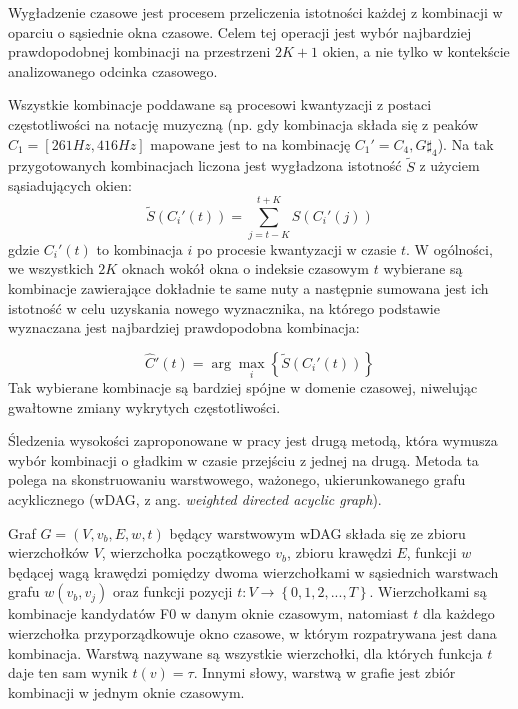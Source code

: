 \documentclass[12pt,a4paper,twoside]{mwart}
\begin{document}
Wygładzenie czasowe jest procesem przeliczenia istotności każdej z kombinacji w oparciu o sąsiednie okna czasowe. Celem tej operacji jest wybór najbardziej prawdopodobnej kombinacji na przestrzeni $2K + 1$ okien, a nie tylko w kontekście analizowanego odcinka czasowego.

Wszystkie kombinacje poddawane są procesowi kwantyzacji z postaci częstotliwości na notację muzyczną (np. gdy kombinacja składa się z peaków $C_1 = [261 Hz, 416 Hz]$ mapowane jest to na kombinację $C_1' = {C_4, G\sharp_4}$). Na tak przygotowanych kombinacjach liczona jest wygładzona istotność $\widetilde{S}$ z użyciem sąsiadujących okien:
\begin{equation} \label{eq:inharmonicity2:smoothedSalience}
  \widetilde{S}(C_i'(t)) = \sum_{j = t - K}^{t+K}S(C_i'(j))
\end{equation}
gdzie $C_i'(t)$ to kombinacja $i$ po procesie kwantyzacji w czasie $t$. W ogólności, we wszystkich $2K$ oknach wokół okna o indeksie czasowym $t$ wybierane są kombinacje zawierające dokładnie te same nuty a następnie sumowana jest ich istotność w celu uzyskania nowego wyznacznika, na którego podstawie wyznaczana jest najbardziej prawdopodobna kombinacja:

\begin{equation} \label{eq:inharmonicity2:smoothedSalience:winner}
\widehat{C}'(t) = \arg \max_i \left\{\widetilde{S}(C_i'(t))\right\}
\end{equation}
Tak wybierane kombinacje są bardziej spójne w domenie czasowej, niwelując gwałtowne zmiany wykrytych częstotliwości.

Śledzenia wysokości zaproponowane w pracy 
\cite[7-8]{Transcription:Pertus:Inharmonicity2} 
jest drugą metodą, która wymusza wybór kombinacji o gładkim w czasie przejściu z jednej na drugą. Metoda ta polega na skonstruowaniu warstwowego, ważonego, ukierunkowanego grafu acyklicznego (wDAG, z ang. \textit{weighted directed acyclic graph}).

Graf $G = \left(V, v_b, E, w, t\right)$ będący warstwowym wDAG składa się ze zbioru wierzchołków $V$, wierzchołka początkowego $v_b$, zbioru krawędzi $E$, funkcji $w$ będącej wagą krawędzi pomiędzy dwoma wierzchołkami w sąsiednich warstwach grafu $w(v_b, v_j)$ oraz funkcji pozycji $t: V \rightarrow \left\{0, 1, 2, ..., T\right\}$. Wierzchołkami są kombinacje kandydatów F0 w danym oknie czasowym, natomiast $t$ dla każdego wierzchołka przyporządkowuje okno czasowe, w którym rozpatrywana jest dana kombinacja. Warstwą nazywane są wszystkie wierzchołki, dla których funkcja $t$ daje ten sam wynik $t(v) = \tau$. Innymi słowy, warstwą w grafie jest zbiór kombinacji w jednym oknie czasowym.
\end{document}

